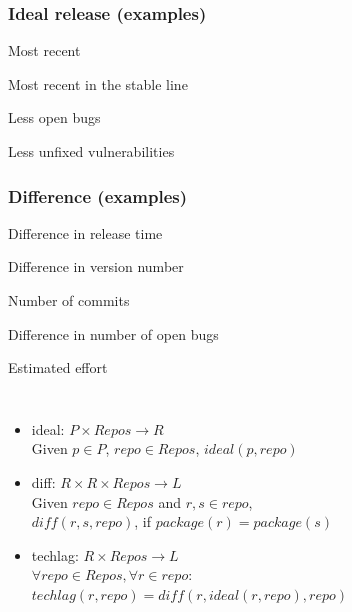 \documentclass[17pt,aspectratio=169,hyperref=pdfusetitle]{beamer}
\begin{document}
\begin{frame}[fragile]
  \frametitle{Ideal release (examples)}

  Most recent

  Most recent in the stable line

  Less open bugs

  Less unfixed vulnerabilities
  
\end{frame}

\begin{frame}[fragile]
  \frametitle{Difference (examples)}

  Difference in release time

  Difference in version number

  Number of commits

  Difference in number of open bugs

  Estimated effort
  
\end{frame}

\begin{frame}[fragile]

  \begin{columns}
    \column{\dimexpr\paperwidth-1cm}
  \begin{itemize}
  \item ideal: $P \times Repos \rightarrow R $ \\
    Given $p \in P$,  $repo \in Repos$, $ideal(p, repo)$ \\

  \item diff: $ R \times R \times Repos \rightarrow L $  \\
    Given $repo \in Repos$ and $r, s \in repo$,  \\
    $diff(r, s, repo)$, if $package(r) = package(s)$

  \item techlag: $R \times Repos \rightarrow L$ \\
    $\forall repo \in Repos, \forall r \in repo$: \\
    $techlag(r, repo) = diff(r, ideal(r, repo), repo)$ \\
  \end{itemize}    

  \end{columns}

\end{frame}
\end{document}
